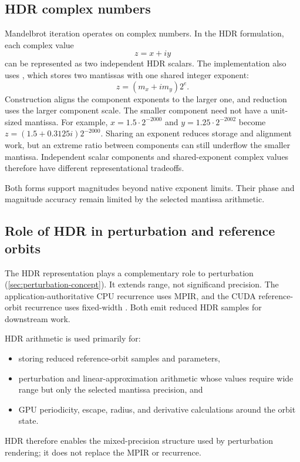 \subsection{HDR complex numbers}

Mandelbrot iteration operates on complex numbers. In the HDR formulation, each
complex value
\[
z = x + i y
\]
can be represented as two independent HDR scalars. The implementation also uses
, which stores two mantissas with one shared
integer exponent:
\[
z=(m_x+i m_y)2^e.
\]
Construction aligns the component exponents to the larger one, and reduction
uses the larger component scale. The smaller component need not have a
unit-sized mantissa. For example,
$x=1.5\cdot2^{-2000}$ and $y=1.25\cdot2^{-2002}$ become
$z=(1.5+0.3125i)2^{-2000}$. Sharing an exponent reduces storage and alignment
work, but an extreme ratio between components can still underflow the smaller
mantissa. Independent scalar components and shared-exponent complex values
therefore have different representational tradeoffs.

Both forms support magnitudes beyond native exponent limits. Their phase and
magnitude accuracy remain limited by the selected mantissa arithmetic.

\subsection{Role of HDR in perturbation and reference orbits}

The HDR representation plays a complementary role to perturbation
(\cref{sec:perturbation-concept}).  It extends range, not significand precision.
The application-authoritative CPU recurrence uses MPIR, and the CUDA
reference-orbit recurrence uses fixed-width .  Both emit
reduced HDR samples for downstream work.

HDR arithmetic is used primarily for:
\begin{itemize}
\item storing reduced reference-orbit samples and parameters,
\item perturbation and linear-approximation arithmetic whose values require wide
      range but only the selected mantissa precision, and
\item GPU periodicity, escape, radius, and derivative calculations around the
       orbit state.
\end{itemize}

HDR therefore enables the mixed-precision structure used by perturbation
rendering; it does not replace the MPIR or  recurrence.

